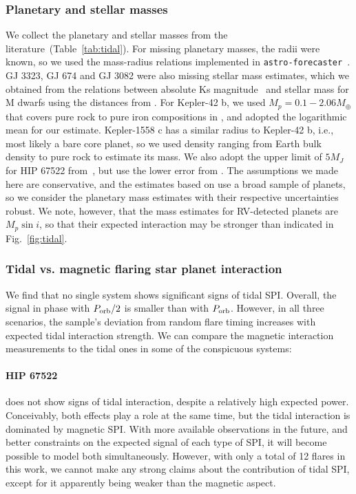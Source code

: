 \documentclass[twocolumn]{aastex631}
\begin{document}
\subsubsection{Planetary and stellar masses}
\label{sec:discussion:mpms}
We collect the planetary and stellar masses from the literature~(Table~\ref{tab:tidal}). For missing planetary masses, the radii were known, so we used the mass-radius relations implemented in \texttt{astro-forecaster}~\citep[Ben Cassesse's implementation of \texttt{forecaster}][]{chen2017probabilistic}. GJ 3323, GJ 674 and GJ 3082 were also missing stellar mass estimates, which we obtained from the \citep{mann2015how, mann2016erratum} relations between absolute Ks magnitude~\citep{skrutskie2006two} and stellar mass for M dwarfs using the distances from \citet{bailer-jones2021estimating}. For Kepler-42 b, we used  $M_p=0.1-2.06M_\oplus$ that covers pure rock to pure iron compositions in \citet{muirhead2012characterizing}, and adopted the logarithmic mean for our estimate. Kepler-1558 c has a similar radius to Kepler-42 b, i.e., most likely a bare core planet, so we used density ranging from Earth bulk density to pure rock to estimate its mass. We also adopt the upper limit of $5M_J$ for HIP 67522 from~\citet{rizzuto2020tess}, but use the lower error from \citet{chen2017probabilistic}. The assumptions we made here are conservative, and the estimates based on \citet{chen2017probabilistic} use a broad sample of planets, so we consider the planetary mass estimates with their respective uncertainties robust. We note, however, that the mass estimates for RV-detected planets are $M_p \sin i$, so that their expected interaction may be stronger than indicated in Fig.~\ref{fig:tidal}. 

\subsubsection{Tidal vs. magnetic flaring star planet interaction}

We find that no single system shows significant signs of tidal SPI. Overall, the signal in phase with $P_{\rm orb}/2$ is smaller than with $P_{\rm orb}$. However, in all three scenarios, the sample's deviation from random flare timing increases with expected tidal interaction strength. We can compare the magnetic interaction measurements to the tidal ones in some of the conspicuous systems:

\paragraph{HIP 67522} does not show signs of tidal interaction, despite a relatively high expected power. Conceivably, both effects play a role at the same time, but the tidal interaction is dominated by magnetic SPI. With more available observations in the future, and better constraints on the expected signal of each type of SPI, it will become possible to model both simultaneously. However, with only a total of 12 flares in this work, we cannot make any strong claims about the contribution of tidal SPI, except for it apparently being weaker than the magnetic aspect.  
\end{document}

